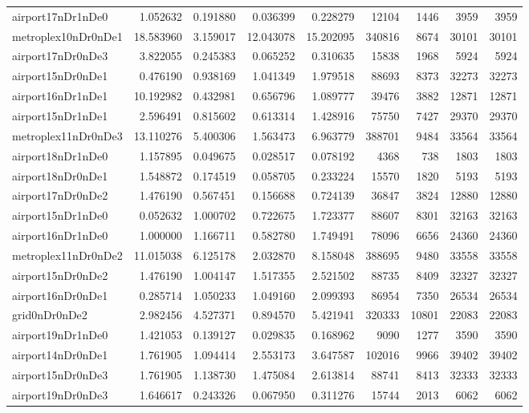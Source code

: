 \begin{longtable}{|l|r|r|r|r|r|r|r|r|}
airport17nDr1nDe0 & 1.052632 & 0.191880 & 0.036399 & 0.228279 & 12104 & 1446 & 3959 & 3959 \\
metroplex10nDr0nDe1 & 18.583960 & 3.159017 & 12.043078 & 15.202095 & 340816 & 8674 & 30101 & 30101 \\
airport17nDr0nDe3 & 3.822055 & 0.245383 & 0.065252 & 0.310635 & 15838 & 1968 & 5924 & 5924 \\
airport15nDr0nDe1 & 0.476190 & 0.938169 & 1.041349 & 1.979518 & 88693 & 8373 & 32273 & 32273 \\
airport16nDr1nDe1 & 10.192982 & 0.432981 & 0.656796 & 1.089777 & 39476 & 3882 & 12871 & 12871 \\
airport15nDr1nDe1 & 2.596491 & 0.815602 & 0.613314 & 1.428916 & 75750 & 7427 & 29370 & 29370 \\
metroplex11nDr0nDe3 & 13.110276 & 5.400306 & 1.563473 & 6.963779 & 388701 & 9484 & 33564 & 33564 \\
airport18nDr1nDe0 & 1.157895 & 0.049675 & 0.028517 & 0.078192 & 4368 & 738 & 1803 & 1803 \\
airport18nDr0nDe1 & 1.548872 & 0.174519 & 0.058705 & 0.233224 & 15570 & 1820 & 5193 & 5193 \\
airport17nDr0nDe2 & 1.476190 & 0.567451 & 0.156688 & 0.724139 & 36847 & 3824 & 12880 & 12880 \\
airport15nDr1nDe0 & 0.052632 & 1.000702 & 0.722675 & 1.723377 & 88607 & 8301 & 32163 & 32163 \\
airport16nDr1nDe0 & 1.000000 & 1.166711 & 0.582780 & 1.749491 & 78096 & 6656 & 24360 & 24360 \\
metroplex11nDr0nDe2 & 11.015038 & 6.125178 & 2.032870 & 8.158048 & 388695 & 9480 & 33558 & 33558 \\
airport15nDr0nDe2 & 1.476190 & 1.004147 & 1.517355 & 2.521502 & 88735 & 8409 & 32327 & 32327 \\
airport16nDr0nDe1 & 0.285714 & 1.050233 & 1.049160 & 2.099393 & 86954 & 7350 & 26534 & 26534 \\
grid0nDr0nDe2 & 2.982456 & 4.527371 & 0.894570 & 5.421941 & 320333 & 10801 & 22083 & 22083 \\
airport19nDr1nDe0 & 1.421053 & 0.139127 & 0.029835 & 0.168962 & 9090 & 1277 & 3590 & 3590 \\
airport14nDr0nDe1 & 1.761905 & 1.094414 & 2.553173 & 3.647587 & 102016 & 9966 & 39402 & 39402 \\
airport15nDr0nDe3 & 1.761905 & 1.138730 & 1.475084 & 2.613814 & 88741 & 8413 & 32333 & 32333 \\
airport19nDr0nDe3 & 1.646617 & 0.243326 & 0.067950 & 0.311276 & 15744 & 2013 & 6062 & 6062 \\

\end{longtable}
